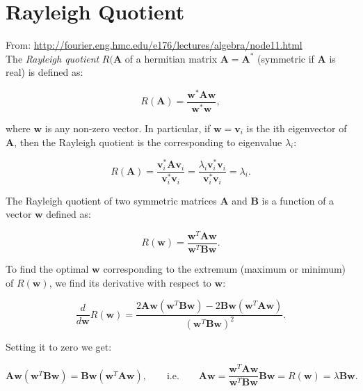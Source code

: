 \documentclass[10pt,b5paper,titlepage]{book}
\begin{document}
\chapter{Rayleigh Quotient}

From: \url{http://fourier.eng.hmc.edu/e176/lectures/algebra/node11.html}\\

The \textit{Rayleigh quotient} $R(\mathbf{A}$ of a hermitian matrix
$\mathbf{A} = \mathbf{A}^{*}$ (symmetric if $\mathbf{A}$ is real) is defined as:

\begin{equation}
    R(\mathbf{A}) = \frac{\mathbf{w}^{*}\mathbf{A}\mathbf{w}}{\mathbf{w}^{*}\mathbf{w}}
,\end{equation}

where $\mathbf{w}$ is any non-zero vector. In particular, if $\mathbf{w} = \mathbf{v}_{i}$
is the ith eigenvector of $\mathbf{A}$, then the Rayleigh quotient is the corresponding
to eigenvalue $\lambda_{i}$:

\begin{equation}
    R(\mathbf{A}) = \frac{\mathbf{v}_{i}^{*}\mathbf{A}\mathbf{v}_{i}}
    {\mathbf{v}_{i}^{*}\mathbf{v}_{i}}
    = \frac{\lambda_{i}\mathbf{v}_{i}^{*}\mathbf{v}_{i}}
    {\mathbf{v}_{i}^{*}\mathbf{v}_{i}}
    = \lambda_{i}
.\end{equation}

The Rayleigh quotient of two symmetric matrices $\mathbf{A}$ and $\mathbf{B}$
is a function of a vector $\mathbf{w}$ defined as:

\begin{equation}
    R(\mathbf{w}) = \frac{\mathbf{w}^{T}\mathbf{A}\mathbf{w}}
    {\mathbf{w}^{T}\mathbf{B}\mathbf{w}}
.\end{equation}

To find the optimal $\mathbf{w}$ corresponding to the extremum (maximum or minimum)
of $R(\mathbf{w})$, we find its derivative with respect to $\mathbf{w}$:

\begin{equation}
    \frac{d}{d \mathbf{w}}R(\mathbf{w}) =
    \frac{2 \mathbf{A}\mathbf{w}(\mathbf{w}^{T}\mathbf{B}\mathbf{w})
    - 2 \mathbf{B}\mathbf{w}(\mathbf{w}^{T}\mathbf{A}\mathbf{w})}
    {(\mathbf{w}^{T}\mathbf{B}\mathbf{w})^{2}}
.\end{equation}

Setting it to zero we get:

\begin{equation}
    \mathbf{A}\mathbf{w}(\mathbf{w}^{T}\mathbf{B}\mathbf{w})
    = \mathbf{B}\mathbf{w}(\mathbf{w}^{T}\mathbf{A}\mathbf{w})
    , \qquad \text{i.e.}\qquad
    \mathbf{A}\mathbf{w} =
    \frac{\mathbf{w}^{T}\mathbf{A}\mathbf{w}}
    {\mathbf{w}^{T}\mathbf{B}\mathbf{w}}\mathbf{B}\mathbf{w}
    = R(\mathbf{w}) = \lambda \mathbf{B}\mathbf{w}
.\end{equation}
\end{document}
